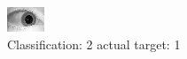 \begin{figure}[h!]
\begin{center}
\includegraphics[width=0.60\columnwidth]{figures/ID1593_class_2_target_1.png}
\end{center}
\caption{ Classification: 2 actual target: 1}
\label{fig:ID1593_class_2_target_1}
\end{figure}
